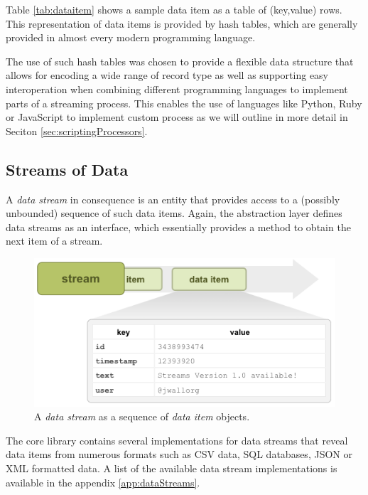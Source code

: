 Table \ref{tab:dataitem} shows a sample data item as a table of
(key,value) rows. This representation of data items is provided
by hash tables, which are generally provided in almost every modern
programming language.

The use of such hash tables was chosen to provide a flexible data
structure that allows for encoding a wide range of record type as well
as supporting easy interoperation when combining different programming
languages to implement parts of a streaming process. This enables the
use of languages like Python, Ruby or JavaScript to implement custom
process as we will outline in more detail in Seciton
\ref{sec:scriptingProcessors}.

\subsection*{Streams of Data}
A {\em data stream} in consequence is an entity that provides access
to a (possibly unbounded) sequence of such data items. Again, the
\streams abstraction layer defines data streams as an interface, which
essentially provides a method to obtain the next item of a stream.

\begin{figure}[h1]
  \begin{center}
    \includegraphics[scale=0.5]{graphics/stream-items.png}
  \end{center}
  \caption{\label{fig:datastream}A {\em data stream} as a sequence of {\em data item} objects.}
\end{figure}

The core \streams library contains several implementations for data
streams that reveal data items from numerous formats such as CSV data,
SQL databases, JSON or XML formatted data. A list of the available
data stream implementations is available in the appendix \ref{app:dataStreams}.

